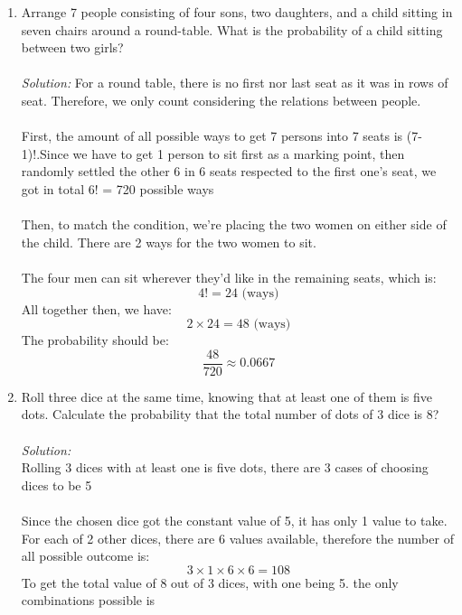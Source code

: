 \documentclass[a4paper]{article}
\begin{document}
\begin{enumerate}
		
		\item Arrange 7 people consisting of four sons, two daughters, and a child sitting in seven chairs around a round-table. What is the probability of a child sitting between two girls?\\\\
		\textit{Solution:}
		For a round table, there is no first nor last seat as it was in rows of seat. Therefore, we only count considering the relations between people.\\\\
		First, the amount of all possible ways to get 7 persons into 7 seats is (7-1)!.Since we have to get 1 person to sit first as a marking point, then randomly settled the other 6 in 6 seats respected to the first one's seat, we got in total 6! = 720 possible ways\\\\
		Then, to match the condition, we're placing the two women on either side of the child. There are 2 ways for the two women to sit.\\\\
		The four men can sit wherever they'd like in the remaining seats, which is: 
		\begin{equation*}
		    4! = 24 \text{ (ways)}
		\end{equation*}
		All together then, we have: 
		\begin{equation*}
		    2 \times 24 = 48 \text{ (ways)}
		\end{equation*}
		The probability should be: 
		\begin{equation*}
		    \frac{48}{720} \approx 0.0667 
		\end{equation*}
		\item Roll three dice at the same time, knowing that at least one of them is five dots. Calculate the probability that the total number of dots of 3 dice is 8?\\\\
		\textit{Solution:} \\
		Rolling 3 dices with at least one is five dots, there are 3 cases of choosing dices to be 5 \\\\
		Since the chosen dice got the constant value of 5, it has only 1 value to take. For each of 2 other dices, there are 6 values available, therefore the number of all possible outcome is:
		\begin{equation*}
		    3\times1\times6\times6 = 108
		\end{equation*}
		To get the total value of 8 out of 3 dices, with one being 5. the only combinations possible is 

\end{enumerate}
\end{document}
